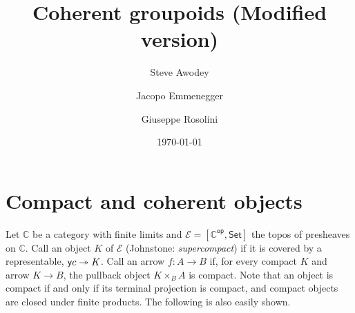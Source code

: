 \documentclass[a4paper,11pt]{amsart}
\title{Coherent groupoids (Modified version)}
\author{Steve Awodey}
\author{Jacopo Emmenegger}
\author{Giuseppe Rosolini}
\date{\today}
\newcommand{\covers}{\twoheadrightarrow}
\newcommand{\Cc}{\mathbb{C}}
\newcommand{\EE}{\mathcal{E}}
\begin{document}
	\maketitle


\section{Compact and coherent objects}
\label{sec:comp-coh}


Let $\Cc$ be a category with finite limits and $\EE = [\Cc^{\mathsf{op}}, \mathsf{Set}]$ the topos of presheaves on $\Cc$.  Call an object $K$ of $\EE$  (Johnstone: \emph{supercompact}) if it is covered by a representable,
$\yo c \covers K$.
Call an arrow $f\colon A\to B$  if, for every compact $K$ and arrow $K \to B$, the pullback object $K\times_B A$ is compact.   Note that an object is compact if and only if its terminal projection is compact, and compact objects are closed under finite products.  The following is also easily shown.

%
\end{document}
